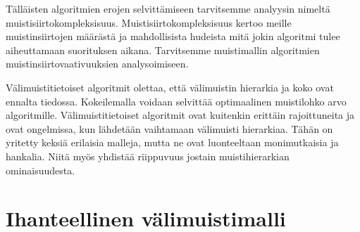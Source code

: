 \documentclass[finnish]{tktltiki2}
\theoremstyle{definition}
\theoremstyle{remark}
\begin{document}
Tälläisten algoritmien erojen selvittämiseen tarvitsemme analyysin
nimeltä muistisiirtokompleksisuus. %
Muistisiirtokompleksisuus kertoo meille muistinsiirtojen määrästä ja
mahdollisista hudeista mitä jokin algoritmi tulee aiheuttamaan suorituksen
aikana. Tarvitsemme muistimallin algoritmien muistinsiirtovaativuuksien analysoimiseen.

Välimuistitietoiset algoritmit olettaa,
että välimuistin hierarkia ja koko ovat ennalta tiedossa. Kokeilemalla voidaan
selvittää optimaalinen muistilohko arvo algoritmille. Välimuistitietoiset
algoritmit ovat kuitenkin erittäin rajoittuneita ja ovat ongelmissa, kun
lähdetään vaihtamaan välimuisti hierarkiaa. Tähän on yritetty keksiä
erilaisia malleja, mutta ne ovat luonteeltaan monimutkaisia ja hankalia. Niitä
myös yhdistää riippuvuus jostain muistihierarkian ominaisuudesta.
%




\section{Ihanteellinen välimuistimalli}
\end{document}
